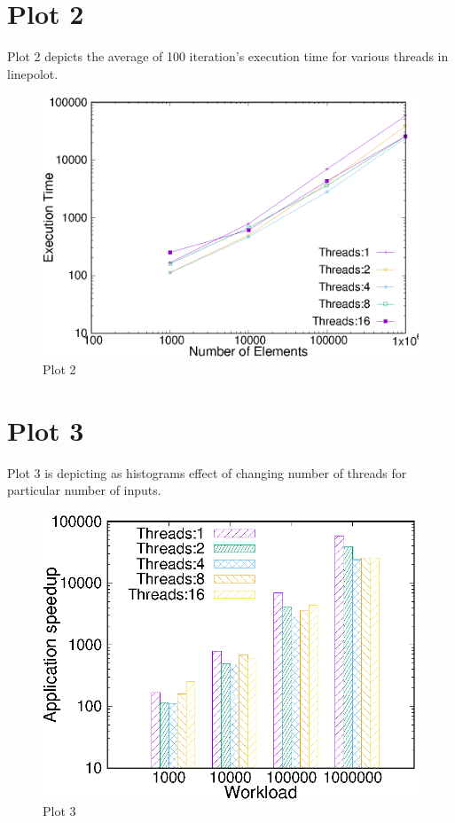 \documentclass{article}
\begin{document}
\section{Plot 2}
Plot 2 depicts the average of 100 iteration's execution time for various threads in linepolot.
\begin{figure}[htb!]
\centering
\includegraphics[scale=0.9]{plot2.eps}
\caption{Plot 2}
\end{figure}

\section{Plot 3}
Plot 3 is depicting as histograms effect of changing number of threads for particular number of inputs.
\begin{figure}[htb!]
\centering
\includegraphics[scale=0.9]{plot3.eps}
\caption{Plot 3}
\end{figure}
\end{document}
